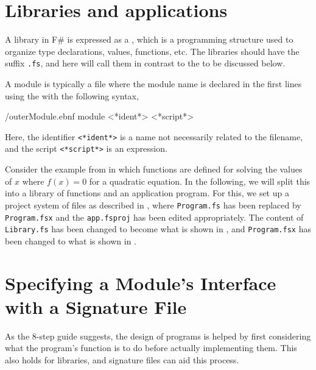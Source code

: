 \documentclass[fsharpNotes.tex]{subfiles}
\begin{document}
\section{Libraries and applications}
\label{sec:modules}
A library in F\# is expressed as a , which is a programming structure used to organize type declarations, values, functions, etc. The libraries should have the suffix \lstinline[language=console]{.fs}, and here will call them  in contrast to the  to be discussed below.

A module is typically a file where the module name is declared in the first lines using the  with the following syntax,
%
\begin{verbatimwrite}{\ebnf/outerModule.ebnf}
module <*ident*>
<*script*>
\end{verbatimwrite}
%
Here, the identifier \lstinline[language=syntax]{<*ident*>} is a name not necessarily related to the filename, and the script \lstinline[language=syntax]{<*script*>} is an expression.

Consider the example from  in which functions are defined for solving the values of $x$ where $f(x)=0$ for a quadratic equation. In the following, we will split this into a library of functions and an application program. For this, we set up a project system of files as described in , where \lstinline[language=console]{Program.fs} has been replaced by \lstinline[language=console]{Program.fsx} and the \lstinline[language=console]{app.fsproj} has been edited appropriately. The content of  \lstinline[language=console]{Library.fs} has been changed to become what is shown in , 
and \lstinline[language=console]{Program.fsx} has been changed to what is shown in .

\section{Specifying a Module's Interface with a Signature File}
As the 8-step guide suggests, the design of programs is helped by first considering what the program's function is to do before actually implementing them. This also holds for libraries, and signature files can aid this process. 
\end{document}
